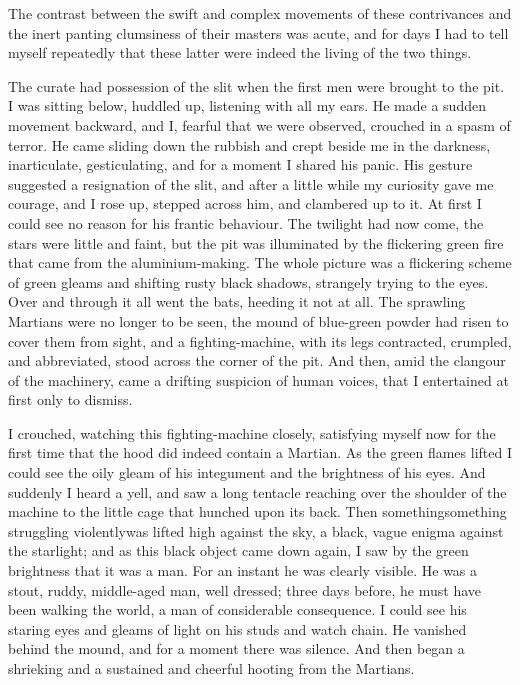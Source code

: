 The contrast between the swift and complex movements of these
contrivances and the inert panting clumsiness of their masters was
acute, and for days I had to tell myself repeatedly that these
latter were indeed the living of the two things.

The curate had possession of the slit when the first men were
brought to the pit. I was sitting below, huddled up, listening with
all my ears. He made a sudden movement backward, and I, fearful
that we were observed, crouched in a spasm of terror. He came
sliding down the rubbish and crept beside me in the darkness,
inarticulate, gesticulating, and for a moment I shared his panic.
His gesture suggested a resignation of the slit, and after a little
while my curiosity gave me courage, and I rose up, stepped across
him, and clambered up to it. At first I could see no reason for his
frantic behaviour. The twilight had now come, the stars were little
and faint, but the pit was illuminated by the flickering green fire
that came from the aluminium-making. The whole picture was a
flickering scheme of green gleams and shifting rusty black shadows,
strangely trying to the eyes. Over and through it all went the
bats, heeding it not at all. The sprawling Martians were no longer
to be seen, the mound of blue-green powder had risen to cover them
from sight, and a fighting-machine, with its legs contracted,
crumpled, and abbreviated, stood across the corner of the pit. And
then, amid the clangour of the machinery, came a drifting suspicion
of human voices, that I entertained at first only to dismiss.

I crouched, watching this fighting-machine closely, satisfying
myself now for the first time that the hood did indeed contain a
Martian. As the green flames lifted I could see the oily gleam of
his integument and the brightness of his eyes. And suddenly I heard
a yell, and saw a long tentacle reaching over the shoulder of the
machine to the little cage that hunched upon its back. Then
something\dash{}something struggling violently\dash{}was lifted high against
the sky, a black, vague enigma against the starlight; and as this
black object came down again, I saw by the green brightness that it
was a man. For an instant he was clearly visible. He was a stout,
ruddy, middle-aged man, well dressed; three days before, he must
have been walking the world, a man of considerable consequence. I
could see his staring eyes and gleams of light on his studs and
watch chain. He vanished behind the mound, and for a moment there
was silence. And then began a shrieking and a sustained and
cheerful hooting from the Martians.

